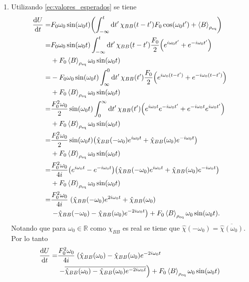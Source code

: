 \documentclass{article}
\begin{document}
\begin{enumerate}
\item Utilizando \eqref{ec:valores_esperados} se tiene
\begin{align}
\begin{split}
\dv{U}{t} =&F_0\omega_0\sin(\omega_0t)\qty(\int_{-\infty}^t\dd{t'}\chi_{BB}(t-t')F_0\cos(\omega_0t')+\ev{B}_{\rho_\text{eq}})\\
=&F_0\omega_0\sin(\omega_0t)\int_{-\infty}^t\dd{t'}\chi_{BB}(t-t')\frac{F_0}{2}\qty(e^{i\omega_0t'}+e^{-i\omega_0t'})\\
&+F_0\ev{B}_{\rho_\text{eq}}\omega_0\sin(\omega_0t)\\
=&-F_0\omega_0\sin(\omega_0t)\int_\infty^0\dd{t'}\chi_{BB}(t')\frac{F_0}{2}\qty(e^{i\omega_0(t-t')}+e^{-i\omega_0(t-t')})\\
&+F_0\ev{B}_{\rho_\text{eq}}\omega_0\sin(\omega_0t)\\
=&\frac{F_0^2\omega_0}{2}\sin(\omega_0t)\int_0^\infty\dd{t'}\chi_{BB}(t')\qty(e^{i\omega_0t}e^{-i\omega_0t'}+e^{-i\omega_0t}e^{i\omega_0t'})\\
&+F_0\ev{B}_{\rho_\text{eq}}\omega_0\sin(\omega_0t)\\
=&\frac{F_0^2\omega_0}{2}\sin(\omega_0t)\qty(\hat{\chi}_{BB}(-\omega_0)e^{i\omega_0t}+\hat{\chi}_{BB}(\omega_0)e^{-i\omega_0t})\\
&+F_0\ev{B}_{\rho_\text{eq}}\omega_0\sin(\omega_0t)\\
=&\frac{F_0^2\omega_0}{4i}\qty(e^{i\omega_0t}-e^{-i\omega_0t})\qty(\hat{\chi}_{BB}(-\omega_0)e^{i\omega_0t}+\hat{\chi}_{BB}(\omega_0)e^{-i\omega_0t})\\
&+F_0\ev{B}_{\rho_\text{eq}}\omega_0\sin(\omega_0t)\\
=&\frac{F_0^2\omega_0}{4i}\left.(\hat{\chi}_{BB}(-\omega_0)e^{2i\omega_0t}+\hat{\chi}_{BB}(\omega_0)\right.\\
&\left.-\hat{\chi}_{BB}(-\omega_0)-\hat{\chi}_{BB}(\omega_0)e^{-2i\omega_0t}\right)+F_0\ev{B}_{\rho_\text{eq}}\omega_0\sin(\omega_0t).
\end{split}
\end{align}
Notando que para $\omega_0\in\mathbb{R}$ como $\chi_{BB}$ es real se tiene que $\hat{\chi}(-\omega_0)=\overline{\hat{\chi}(\omega_0)}$. Por lo tanto
\begin{align}
\begin{split}
\dv{U}{t} (t)=&\frac{F_0^2\omega_0}{4i}\left.(\hat{\chi}_{BB}(\omega_0)-\hat{\chi}_{BB}(\omega_0)e^{-2i\omega_0t}\right.\\
&\left.-\overline{\hat{\chi}_{BB}(\omega_0)-\hat{\chi}_{BB}(\omega_0)e^{-2i\omega_0t}}\right)+F_0\ev{B}_{\rho_\text{eq}}\omega_0\sin(\omega_0t)\\

\end{split}
\end{align}
\end{enumerate}
\end{document}
